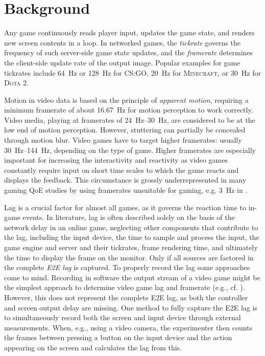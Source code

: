 \section{Background}
\label{sec:background}

Any game continuously reads player input, updates the game state, and renders new screen contents in a loop. In networked games, the \textit{tickrate} governs the frequency of such server-side game state updates, and the \textit{framerate} determines the client-side update rate of the output image. Popular examples for game tickrates include \SI{64}{\hertz} or \SI{128}{\hertz} for \textsc{CS:GO}, \SI{20}{\hertz} for \textsc{Minecraft}, or \SI{30}{\hertz} for \textsc{Dota 2}.

Motion in video data is based on the principle of \textit{apparent motion}, requiring a minimum framerate of about \SI{16.67}{\hertz} for motion perception to work correctly. Video media, playing at framerates of \SIrange{24}{30}{\hertz}, are considered to be at the low end of motion perception. However, stuttering can partially be concealed through motion blur. Video games have to target higher framerates: usually \SIrange{30}{144}{\hertz}, depending on the type of game. Higher framerates are especially important for increasing the interactivity and reactivity as video games constantly require input on short time scales to which the game reacts and displays the feedback. This circumstance is grossly underrepresented in many gaming \gls{QoE} studies by using framerates unsuitable for gaming, e.g. \SI{3}{\hertz} in \cite{claypool2007}.

Lag is a crucial factor for almost all games, as it governs the reaction time to in-game events. In literature, lag is often described solely on the basis of the network delay in an online game, neglecting other components that contribute to the lag, including the input device, the time to sample and process the input, the game engine and server and their tickrates, frame rendering time, and ultimately the time to display the frame on the monitor. Only if all sources are factored in the complete \textit{\gls{E2E} lag} is captured. To properly record the lag some approaches come to mind. Recording in software the output stream of a video game might be the simplest approach to determine video game lag and framerate (e.g., cf. \cite{Chen:2011:MLC:2072298.2071991}). However, this does not represent the complete \gls{E2E} lag, as both the controller and screen output delay are missing. One method to fully capture the \gls{E2E} lag is to simultaneously record both the screen and input device through external measurements. When, e.g., using a video camera, the experimenter then counts the frames between pressing a button on the input device and the action appearing on the screen and calculates the lag from this.
